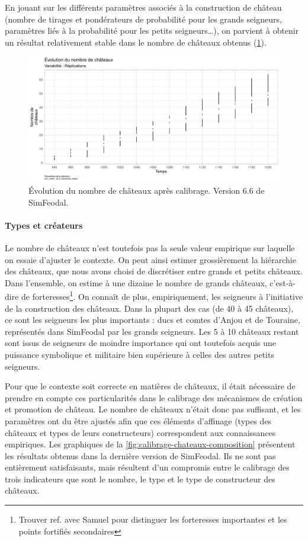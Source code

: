 En jouant sur les différents paramètres associés à la construction de château (nombre de tirages et pondérateurs de probabilité pour les grands seigneurs, paramètres liés à la probabilité pour les petits seigneurs\ldots), on parvient à obtenir un résultat relativement stable dans le nombre de châteaux obtenus (\cref{fig:calibrage-chateaux-nb}).

\begin{figure}[H]
	\centering
	\includegraphics[width=.9\linewidth]{img/results_6_6/Chateaux_Nb_Haut.pdf}
	\caption{Évolution du nombre de châteaux après calibrage. Version 6.6 de SimFeodal.}
	\label{fig:calibrage-chateaux-nb}
\end{figure}

\paragraph{Types et créateurs}

Le nombre de châteaux n'est toutefois pas la seule valeur empirique sur laquelle on essaie d'ajuster le contexte.
On peut ainsi estimer grossièrement la hiérarchie des châteaux, que nous avons choisi de discrétiser entre grands et petits châteaux.
Dans l'ensemble, on estime à une dizaine le nombre de \og grands châteaux\fg{}, c'est-à-dire de \og forteresses\fg{}\footnote{
	Trouver ref. avec Samuel pour distinguer les \og forteresses importantes\fg{} et les \og points fortifiés secondaires\fg{}
}.
On connaît de plus, empiriquement, les seigneurs à l'initiative de la construction des châteaux.
Dans la plupart des cas (de 40 à 45 châteaux), ce sont les seigneurs les plus importants : ducs et comtes d'Anjou et de Touraine, représentés dans SimFeodal par les grands seigneurs.
Les 5 à 10 châteaux restant sont issus de seigneurs de moindre importance qui ont toutefois acquis une puissance symbolique et militaire bien supérieure à celles des autres petits seigneurs.

Pour que le contexte soit correcte en matières de châteaux, il était nécessaire de prendre en compte ces particularités dans le calibrage des mécanismes de création et promotion de château.
Le nombre de châteaux n'était donc pas suffisant, et les paramètres ont du être ajustés afin que ces éléments d'affinage (types des châteaux et types de leurs constructeurs) correspondent aux connaissances empiriques.
Les graphiques de la \cref{fig:calibrage-chateaux-composition} présentent les résultats obtenus dans la dernière version de SimFeodal.
Ils ne sont pas entièrement satisfaisants, mais résultent d'un compromis entre le calibrage des trois indicateurs que sont le nombre, le type et le type de constructeur des châteaux.

